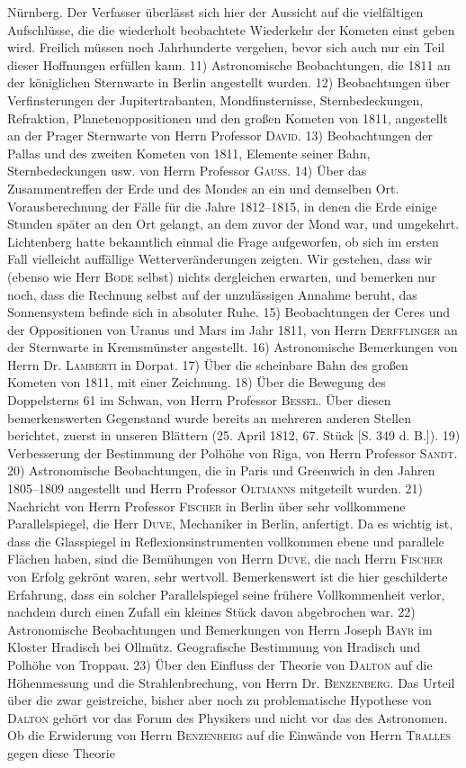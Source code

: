 Nürnberg. Der Verfasser überlässt sich hier der Aussicht auf die vielfältigen Aufschlüsse, die die wiederholt beobachtete Wiederkehr der Kometen einst geben wird. Freilich müssen noch Jahrhunderte vergehen, bevor sich auch nur ein Teil dieser Hoffnungen erfüllen kann. 11) Astronomische Beobachtungen, die 1811 an der königlichen Sternwarte in Berlin angestellt wurden. 12) Beobachtungen über Verfinsterungen der Jupitertrabanten, Mondfinsternisse, Sternbedeckungen, Refraktion, Planetenoppositionen und den großen Kometen von 1811, angestellt an der Prager Sternwarte von Herrn Professor \textsc{David}. 13) Beobachtungen der Pallas und des zweiten Kometen von 1811, Elemente seiner Bahn, Sternbedeckungen usw. von Herrn Professor \textsc{Gauss}. 14) Über das Zusammentreffen der Erde und des Mondes an ein und demselben Ort. Vorausberechnung der Fälle für die Jahre 1812--1815, in denen die Erde einige Stunden später an den Ort gelangt, an dem zuvor der Mond war, und umgekehrt. Lichtenberg hatte bekanntlich einmal die Frage aufgeworfen, ob sich im ersten Fall vielleicht auffällige Wetterveränderungen zeigten. Wir gestehen, dass wir (ebenso wie Herr \textsc{Bode} selbst) nichts dergleichen erwarten, und bemerken nur noch, dass die Rechnung selbst auf der unzulässigen Annahme beruht, das Sonnensystem befinde sich in absoluter Ruhe. 15) Beobachtungen der Ceres und der Oppositionen von Uranus und Mars im Jahr 1811, von Herrn \textsc{Derfflinger} an der Sternwarte in Kremsmünster angestellt. 16) Astronomische Bemerkungen von Herrn Dr. \textsc{Lamberti} in Dorpat. 17) Über die scheinbare Bahn des großen Kometen von 1811, mit einer Zeichnung. 18) Über die Bewegung des Doppelsterns 61 im Schwan, von Herrn Professor \textsc{Bessel}. Über diesen bemerkenswerten Gegenstand wurde bereits an mehreren anderen Stellen berichtet, zuerst in unseren Blättern (25. April 1812, 67. Stück [S. 349 d. B.]). 19) Verbesserung der Bestimmung der Polhöhe von Riga, von Herrn Professor \textsc{Sandt}. 20) Astronomische Beobachtungen, die in Paris und Greenwich in den Jahren 1805--1809 angestellt und Herrn Professor \textsc{Oltmanns} mitgeteilt wurden. 21) Nachricht von Herrn Professor \textsc{Fischer} in Berlin über sehr vollkommene Parallelspiegel, die Herr \textsc{Duve}, Mechaniker in Berlin, anfertigt. Da es wichtig ist, dass die Glasspiegel in Reflexionsinstrumenten vollkommen ebene und parallele Flächen haben, sind die Bemühungen von Herrn \textsc{Duve}, die nach Herrn \textsc{Fischer} von Erfolg gekrönt waren, sehr wertvoll. Bemerkenswert ist die hier geschilderte Erfahrung, dass ein solcher Parallelspiegel seine frühere Vollkommenheit verlor, nachdem durch einen Zufall ein kleines Stück davon abgebrochen war. 22) Astronomische Beobachtungen und Bemerkungen von Herrn Joseph \textsc{Bayr} im Kloster Hradisch bei Ollmütz. Geografische Bestimmung von Hradisch und Polhöhe von Troppau. 23) Über den Einfluss der Theorie von \textsc{Dalton} auf die Höhenmessung und die Strahlenbrechung, von Herrn Dr. \textsc{Benzenberg}. Das Urteil über die zwar geistreiche, bisher aber noch zu problematische Hypothese von \textsc{Dalton} gehört vor das Forum des Physikers und nicht vor das des Astronomen. Ob die Erwiderung von Herrn \textsc{Benzenberg} auf die Einwände von Herrn \textsc{Tralles} gegen diese Theorie 